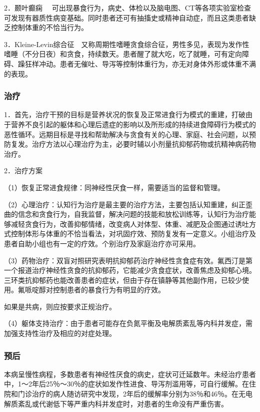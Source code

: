 2．颞叶癫痫
　可出现暴食行为，病史、体检以及脑电图、CT等各项实验室检查可发现有器质性病变基础。同时患者还可有抽搐史或精神自动症，而且这类患者缺乏控制体重的不恰当行为。

3．Kleine-Levin综合征　又称周期性嗜睡贪食综合征，男性多见，表现为发作性嗜睡（不分日夜）和贪食，持续数天。患者醒了就大吃，吃了就睡，可有定向障碍、躁狂样冲动。患者无催吐、导泻等控制体重行为，亦无对身体外形或体重不满的表现。

\subsubsection{治疗}

1．首先，治疗干预的目标是营养状况的恢复及正常进食行为模式的重建，打破由于营养不良引起的躯体和心理后遗症的影响以及所形成的持续进食障碍行为模式的恶性循环。远期目标是寻找和帮助解决与贪食有关的心理、家庭、社会问题，以预防复发。治疗方法以心理治疗为主，必要时辅以小剂量抗抑郁药物或抗精神病药物治疗。

2．治疗方案

（1）恢复正常进食规律：同神经性厌食一样，需要适当的监督和管理。

（2）心理治疗：认知行为治疗是最主要的治疗方法，主要包括认知重建，纠正歪曲的信念和贪食行为，自我监督，解决问题的技能和放松训练等，认知行为治疗能够减轻贪食行为，改善抑郁情绪，改变病人对体型、体重、减肥及企图通过诱吐方式控制体形与体重的不恰当看法，对巩固疗效、预防复发有一定意义。小组治疗及患者自助小组也有一定的疗效。个别治疗及家庭治疗亦可采用。

（3）药物治疗：双盲对照研究表明抗抑郁药治疗神经性贪食症有效。氟西汀是第一个报道治疗神经性贪食的抗抑郁药，它能减少贪食症状，改善焦虑及抑郁心境。三环类抗抑郁药也能改善患者的症状，但由于存在镇静等其他副作用，已较少使用。氟哌啶醇对控制患者的暴食行为有明显的疗效。

如果是共病，则应按要求正规治疗。

（4）躯体支持治疗：由于患者可能存在负氮平衡及电解质紊乱等内科并发症，需加强支持性治疗及相应的对症处理。

\subsubsection{预后}

本病呈慢性病程，多数患者有神经性厌食的病史，症状可迁延数年。未经治疗患者中，1～2年后25％～30％的症状如发作性进食、导泻剂滥用等，可自行缓解。在住院和门诊治疗的病人随访研究中发现，2年后的缓解率分别为38％和46％。在无电解质紊乱或代谢低下等严重内科并发症时，对患者的生命没有严重伤害。


